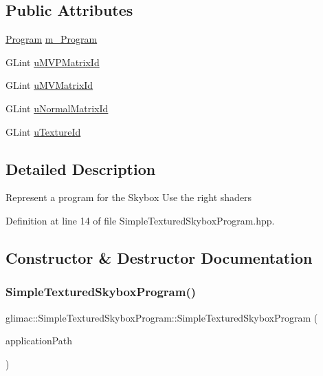 \subsection*{Public Attributes}
\begin{DoxyCompactItemize}
\item 
\hyperlink{classglimac_1_1_program}{Program} \hyperlink{classglimac_1_1_simple_textured_skybox_program_a0572a57424eae571f9a56067629c7396}{m\+\_\+\+Program}
\item 
G\+Lint \hyperlink{classglimac_1_1_simple_textured_skybox_program_a2be46c62f2eeeb0739a036e668601cd0}{u\+M\+V\+P\+Matrix\+Id}
\item 
G\+Lint \hyperlink{classglimac_1_1_simple_textured_skybox_program_a89e896ecf8de0b1b0c4a90f9e257e02c}{u\+M\+V\+Matrix\+Id}
\item 
G\+Lint \hyperlink{classglimac_1_1_simple_textured_skybox_program_a8969be7162bc5fba747935acf57a7f6b}{u\+Normal\+Matrix\+Id}
\item 
G\+Lint \hyperlink{classglimac_1_1_simple_textured_skybox_program_a2aea226c342ca980bc7941fe83e4ed05}{u\+Texture\+Id}
\end{DoxyCompactItemize}


\subsection{Detailed Description}
Represent a program for the Skybox Use the right shaders 

Definition at line 14 of file Simple\+Textured\+Skybox\+Program.\+hpp.



\subsection{Constructor \& Destructor Documentation}
\mbox{\label{classglimac_1_1_simple_textured_skybox_program_a234bd930789845e1e97a389d3a577d2a}} 
\subsubsection{\texorpdfstring{Simple\+Textured\+Skybox\+Program()}{SimpleTexturedSkyboxProgram()}}
{\footnotesize\ttfamily glimac\+::\+Simple\+Textured\+Skybox\+Program\+::\+Simple\+Textured\+Skybox\+Program (\begin{DoxyParamCaption}\item[{const \hyperlink{classglimac_1_1_file_path}{File\+Path} \&}]{application\+Path }\end{DoxyParamCaption})\hspace{0.3cm}{\ttfamily [inline]}}

